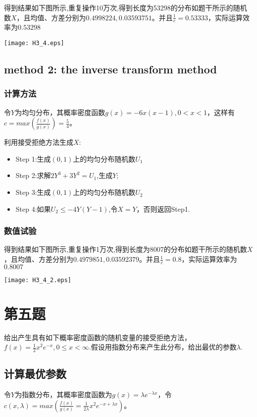 \documentclass{ctexart}
\begin{document}
得到结果如下图所示,重复操作10万次,得到长度为53298的分布如题干所示的随机数\(X\)，且均值、方差分别为\(0.4998224,0.03593751\)。并且\(\frac{1}{c}=0.53333\)，实际运算效率为\(0.53298\)

\centerline{\texttt{[image: H3\_4.eps]}}


\subsection{method 2: the inverse transform method}

\subsubsection{计算方法}

令\(Y\)为均匀分布，其概率密度函数\(g(x)=-6x(x-1),  0<x<1\)，这样有\(c= max (\frac{f(x)}{g(x)})=\frac{5}{4}\)。

利用接受拒绝方法生成\(X\):
\begin{itemize} 
\item Step 1:生成\((0,1)\)上的均匀分布随机数\(U_1\)
\item Step 2:求解\(2Y^3+3Y^2=U_1\),生成\(Y \);
\item Step 3:生成\((0,1)\)上的均匀分布随机数\(U_2\)
\item Step 4:如果\(U_2 \leq -4Y(Y-1)\),令\(X=Y\)，否则返回Step1.

\end{itemize}

\subsubsection{数值试验}

得到结果如下图所示,重复操作1万次,得到长度为8007的分布如题干所示的随机数\(X\)，且均值、方差分别为\(0.4979851,0.03592379\)。并且\(\frac{1}{c}=0.8\)，实际运算效率为\(0.8007\)

\centerline{\texttt{[image: H3\_4\_2.eps]}}


\section{第五题}  

给出产生具有如下概率密度函数的随机变量的接受拒绝方法，\(f(x)=\frac{1}{2}x^2e^{-x},0 \leq x <\infty\).假设用指数分布来产生此分布，给出最优的参数\(\lambda\).



\subsection{计算最优参数}
令\(Y\)为指数分布，其概率密度函数为\(g(x)=\lambda e^{-\lambda x}\)，令\(c(x,\lambda) = max(\frac{f(x)}{g(x)}=\frac{1}{2\lambda}x^2 e^{-x+\lambda x})\)。
\end{document}
